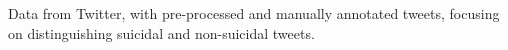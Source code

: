 Data from Twitter, with pre-processed and manually annotated tweets, focusing on distinguishing suicidal and non-suicidal tweets.